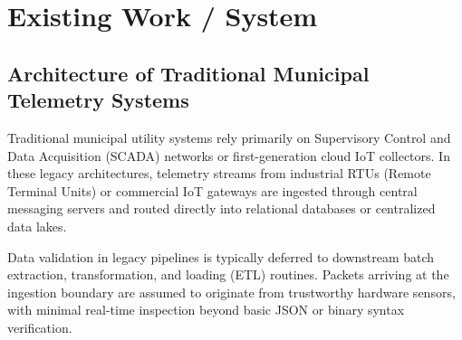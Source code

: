 \documentclass[a4paper]{article}
\begin{document}
\section{Existing Work / System}

\subsection{Architecture of Traditional Municipal Telemetry Systems}
Traditional municipal utility systems rely primarily on Supervisory Control and Data Acquisition (SCADA) networks or first-generation cloud IoT collectors. In these legacy architectures, telemetry streams from industrial RTUs (Remote Terminal Units) or commercial IoT gateways are ingested through central messaging servers and routed directly into relational databases or centralized data lakes.

Data validation in legacy pipelines is typically deferred to downstream batch extraction, transformation, and loading (ETL) routines. Packets arriving at the ingestion boundary are assumed to originate from trustworthy hardware sensors, with minimal real-time inspection beyond basic JSON or binary syntax verification.
\end{document}

